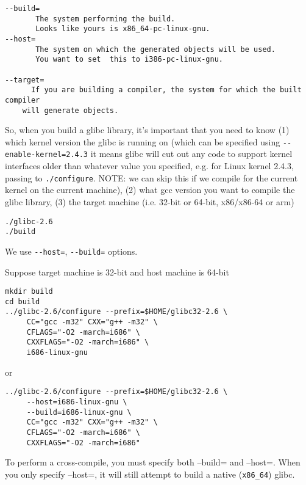 \begin{verbatim}
--build= 
       The system performing the build. 
       Looks like yours is x86_64-pc-linux-gnu.
--host= 
       The system on which the generated objects will be used. 
       You want to set  this to i386-pc-linux-gnu.
       
--target= 
      If you are building a compiler, the system for which the built compiler
    will generate objects.
\end{verbatim}


So, when you build a glibc library, it's important that you need to know (1)
which kernel version the glibc is running on (which can be specified using
\verb!--enable-kernel=2.4.3! it means glibc will cut out any code to support
kernel interfaces older than whatever value you specified, e.g. for Linux kernel
2.4.3, passing to \verb!./configure!. NOTE: we can skip this if we compile for
the current kernel on the current machine), (2) what gcc version you want to
compile the glibc library, (3) the target machine (i.e. 32-bit or 64-bit,
x86/x86-64 or arm)

\begin{verbatim}
./glibc-2.6
./build
\end{verbatim}
We use \verb!--host=!, \verb!--build=! options.


Suppose target machine is 32-bit and host machine is 64-bit
\begin{verbatim}
mkdir build
cd build
../glibc-2.6/configure --prefix=$HOME/glibc32-2.6 \
     CC="gcc -m32" CXX="g++ -m32" \
     CFLAGS="-O2 -march=i686" \
     CXXFLAGS="-O2 -march=i686" \
     i686-linux-gnu
\end{verbatim}

or
\begin{verbatim}
../glibc-2.6/configure --prefix=$HOME/glibc32-2.6 \
     --host=i686-linux-gnu \
     --build=i686-linux-gnu \
     CC="gcc -m32" CXX="g++ -m32" \
     CFLAGS="-O2 -march=i686" \
     CXXFLAGS="-O2 -march=i686"
\end{verbatim}
To perform a cross-compile, you must specify both --build= and --host=. When you
only specify --host=, it will still attempt to build a native (\verb!x86_64!)
glibc.


% 


